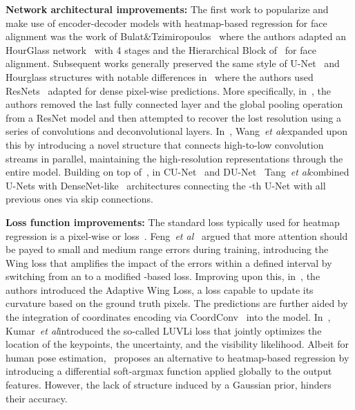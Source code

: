 \documentclass{bmvc2k}
\makeatletter
\DeclareRobustCommand\onedot{\futurelet\@let@token\@onedot}
\def\@onedot{\ifx\@let@token.\else.\null\fi\xspace}
\def\etal{\emph{et al}\onedot}
\def\etal{\emph{et al}\bmvaOneDot}
\makeatother
\begin{document}
\noindent\textbf{Network architectural improvements:} The first work to popularize and make use of encoder-decoder models with heatmap-based regression for face alignment was the work of Bulat\&Tzimiropoulos~\cite{bulat2017far} where the authors adapted an HourGlass network~\cite{newell2016stacked} with 4 stages and the Hierarchical Block of~\cite{bulat2017binarized} for face alignment. Subsequent works generally preserved the same style of U-Net~\cite{ronneberger2015u} and Hourglass structures with notable differences in~\cite{xiao2018simple,sun2019high,wang2020deep} where the authors used ResNets~\cite{he2016deep} adapted for dense pixel-wise predictions. More specifically, in~\cite{xiao2018simple}, the authors removed the last fully connected layer and the global pooling operation from a ResNet model and then attempted to recover the lost resolution using  a series of convolutions and deconvolutional layers. In~\cite{wang2020deep}, Wang~\etal expanded upon this by introducing a novel structure that connects high-to-low  convolution streams in  parallel, maintaining the  high-resolution representations through  the entire model. Building on top of~\cite{bulat2017far}, in CU-Net~\cite{tang2019towards} and DU-Net~\cite{tang2018quantized} Tang~\etal combined U-Nets with DenseNet-like~\cite{huang2017densely} architectures connecting the -th U-Net with all previous ones via skip connections.

\noindent\textbf{Loss function improvements:} The standard loss typically used for heatmap regression is a pixel-wise  or  loss~\cite{bulat2016convolutional,bulat2016two,bulat2017far,sun2019deep,wang2020deep,tang2019towards}. Feng~\etal~\cite{feng2018wing} argued that more attention should be payed to small and medium range errors during training, introducing the Wing loss that amplifies the impact of the errors within a defined interval by switching from an  to a modified -based loss. Improving upon this, in~\cite{wang2019adaptive}, the authors introduced the Adaptive Wing Loss, a loss capable to update its curvature based on the ground truth pixels. The predictions are further aided by the integration of coordinates encoding via CoordConv~\cite{liu2018intriguing} into the model.
In~\cite{kumar2020luvli}, Kumar~\etal introduced the so-called LUVLi loss that jointly optimizes the location of the keypoints, the uncertainty, and the visibility likelihood. Albeit for human pose estimation,~\cite{luvizon20182d} proposes an alternative to heatmap-based regression by introducing a differential soft-argmax function applied globally to the output features. However, the lack of structure induced by a Gaussian prior,  hinders their accuracy.
\end{document}
